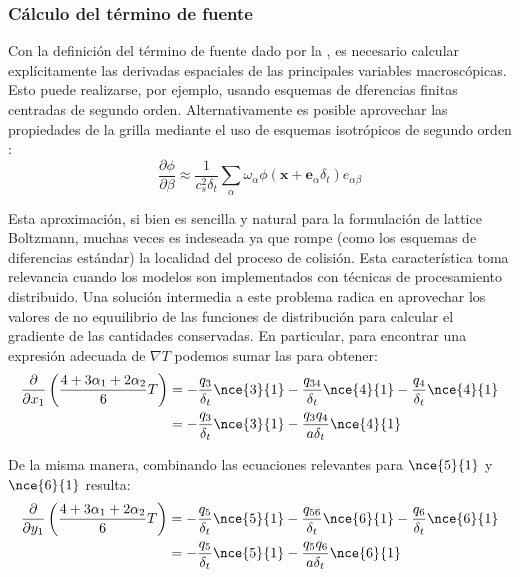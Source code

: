 
\subsubsection{C\'alculo del t\'ermino de fuente}

Con la definici\'on del t\'ermino de fuente dado por la , es necesario calcular expl\'icitamente las derivadas espaciales de las principales variables macrosc\'opicas. Esto puede realizarse, por ejemplo, usando esquemas de dferencias finitas centradas de segundo orden. Alternativamente es posible aprovechar las propiedades de la grilla mediante el uso de esquemas isotr\'opicos de segundo orden \cite{lee_stable_2005}:
\begin{equation}
	\dfrac{\partial \phi}{\partial \beta} \approx \dfrac{1}{c_s^2 \delta_t} \sum_{\alpha} \omega_{\alpha} \phi(\bm{x} + \bm{e}_{\alpha}\delta_t)e_{\alpha\beta}
\end{equation}

Esta aproximaci\'on, si bien es sencilla y natural para la formulaci\'on de lattice Boltzmann, muchas veces es indeseada ya que rompe (como los esquemas de diferencias est\'andar) la localidad del proceso de colisi\'on. Esta caracter\'istica toma relevancia cuando los modelos son implementados con t\'ecnicas de procesamiento distribuido. Una soluci\'on intermedia a este problema radica en aprovechar los valores de no equuilibrio de las funciones de distribuci\'on para calcular el gradiente de las cantidades conservadas. En particular, para encontrar una expresi\'on adecuada de $\nabla T$ podemos sumar las  para obtener:
\begin{equation}
\begin{aligned}
	\dfrac{\partial}{\partial x_1} \left( \dfrac{4+3\alpha_1+2\alpha_2}{6} T \right) &= -\dfrac{q_3}{\delta_t} \nce{3}{1} - \dfrac{q_{34}}{\delta_t} \nce{4}{1} - \dfrac{q_4}{\delta_t} \nce{4}{1} \\
	&= -\dfrac{q_3}{\delta_t} \nce{3}{1} - \dfrac{q_3 q_4}{a \delta_t} \nce{4}{1}
\end{aligned}
	\label{eq:partial_1_x}
\end{equation}

De la misma manera, combinando las ecuaciones relevantes para $\nce{5}{1}$ y $\nce{6}{1}$ resulta:
\begin{equation}
\begin{aligned}
	\dfrac{\partial}{\partial y_1} \left( \dfrac{4+3\alpha_1+2\alpha_2}{6} T \right) &= -\dfrac{q_5}{\delta_t} \nce{5}{1} - \dfrac{q_{56}}{\delta_t} \nce{6}{1} - \dfrac{q_6}{\delta_t} \nce{6}{1} \\
	&= -\dfrac{q_5}{\delta_t} \nce{5}{1} - \dfrac{q_5 q_6}{a \delta_t} \nce{6}{1}
\end{aligned}
	\label{eq:partial_1_y}
\end{equation}

